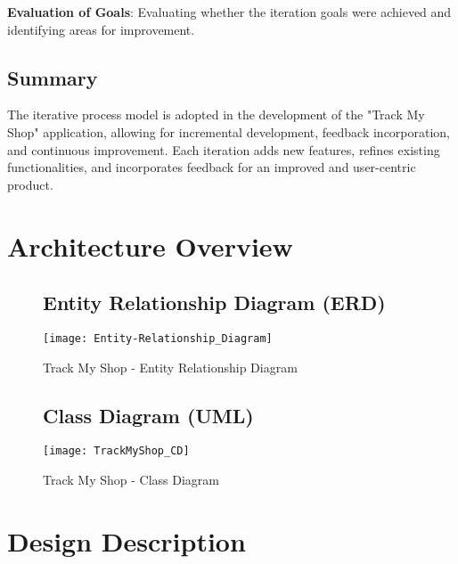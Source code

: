 \textbf{Evaluation of Goals}:
Evaluating whether the iteration goals were achieved and identifying areas for improvement.

\subsection{Summary}

The iterative process model is adopted in the development of the "Track My Shop" application, allowing for incremental development, feedback incorporation, and continuous improvement. Each iteration adds new features, refines existing functionalities, and incorporates feedback for an improved and user-centric product.






\section{Architecture Overview}


\begin{figure}[h]
	\subsection{Entity Relationship Diagram (ERD) }
	\centering
	\texttt{[image: Entity-Relationship\_Diagram]}
	\caption{Track My Shop - Entity Relationship Diagram}
\end{figure}


\begin{figure}[h]
	\subsection{Class Diagram (UML) }
	\centering
	\texttt{[image: TrackMyShop\_CD]}
	\caption{Track My Shop - Class Diagram}
\end{figure}



\section{Design Description}




